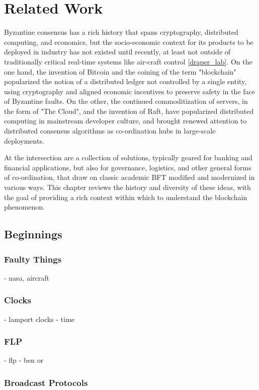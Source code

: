 \chapter{Related Work}
\label{ch:related}

Byzantine consensus has a rich history that spans cryptography, distributed computing, and economics,
but the socio-economic context for its products to be deployed in industry has not existed until recently,
at least not outside of traditionally critical real-time systems like air-craft control \ref{draper_lab}.
On the one hand, the invention of Bitcoin and the coining of the term "blockchain" popularized the notion
of a distributed ledger not controlled by a single entity, using cryptography and aligned economic incentives to 
preserve safety in the face of Byzantine faults.
On the other, the continued commoditization of servers, in the form of "The Cloud", and the invention of Raft, 
have popularized distributed computing in mainstream developer culture, 
and brought renewed attention to distributed consensus algorithms as co-ordination hubs in large-scale deployments. 

At the intersection are a collection of solutions, typically geared for banking and financial applications,
but also for governance, logistics, and other general forms of co-ordination, 
that draw on classic academic BFT modified and modernized in various ways.
This chapter reviews the history and diversity of these ideas, with the goal of providing a rich context within which to 
understand the blockchain phenomenon.

\section{Beginnings}
\subsection{Faulty Things}
	- nasa, aircraft
\subsection{Clocks}
	- lamport clocks
	- time
\subsection{FLP}
	- flp
	- ben or
\subsection{Broadcast Protocols}

